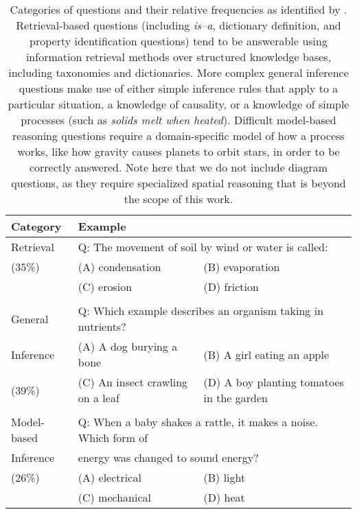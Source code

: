 \begin{table*}[t]
\caption{ 
Categories of questions and their relative frequencies as identified by \citet{clark:2013}. Retrieval-based questions (including \emph{is--a}, dictionary definition, and property identification questions) tend to be answerable using information retrieval methods over structured knowledge bases, including taxonomies and dictionaries. 
More complex general inference questions make use of either simple inference rules that apply to a particular situation, a knowledge of causality, or a knowledge of simple processes (such as \emph{solids melt when heated}).
Difficult model-based reasoning questions require a domain-specific model of how a process works, like how gravity causes planets to orbit stars, in order to be correctly answered.
Note here that we do not include diagram questions, as they require specialized spatial reasoning that is beyond the scope of this work. 
}
\begin{center}
\small
\begin{tabularx}{\textwidth}{p{2.5cm}p{5.2cm}p{5.9cm}}
\hline
Category &	\multicolumn{2}{l}{Example} \\
\hline
Retrieval	&	\multicolumn{2}{l}{Q: The movement of soil by wind or water is called:} \\
(35\%)		&   (A) condensation   	&	(B) evaporation   \\
			&	(C) erosion   		&	(D) friction \\
\\
General 	&	\multicolumn{2}{l}{Q: Which example describes an organism taking in nutrients?} \\
Inference	&   (A) A dog burying a bone			&   (B) A girl eating an apple	\\
(39\%)		&	(C) An insect crawling on a leaf	&  (D) A boy planting tomatoes in the garden  \\
\\
Model-based & 	\multicolumn{2}{l}{Q: When a baby shakes a rattle, it makes a noise. Which form of} \\
Inference	& 	\multicolumn{2}{l}{energy was changed to sound energy?} \\
(26\%)		&	(A) electrical	&   (B) light   \\
			&	(C) mechanical	&   (D) heat  \\
			
\end{tabularx}
\label{tab:inferenceexamples}
\end{center}
\end{table*}

